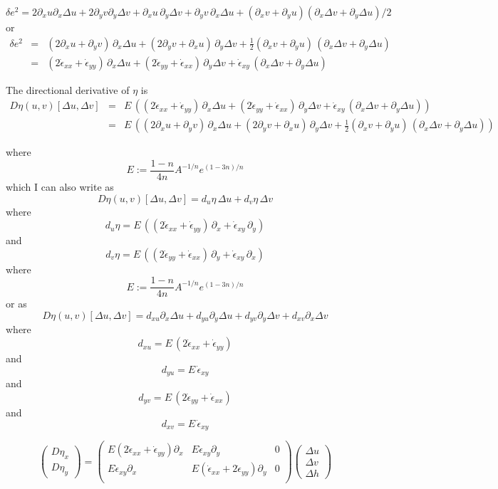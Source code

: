 \documentclass[10pt,a4paper]{book}
\newcommand{\p}{\partial}
\newcommand{\exx}{\dot{\epsilon}_{xx}}
\newcommand{\eyy}{\dot{\epsilon}_{yy}}
\newcommand{\exy}{\dot{\epsilon}_{xy}}
\begin{document}
\[ \delta e^2=  2 \p_x u  \p_x \Delta u 
+  2 \p_y v \p_y \Delta v  
+  \p_x u  \, \p_y \Delta v +  \p_y v \, \p_x \Delta u  
+ (\p_x v+\p_y u )(\p_x \Delta v + \p_y \Delta u)/2
\]
or
\begin{eqnarray*}
\delta e^2&=&  
  ( 2 \p_x u  +  \p_y v ) \, \p_x \Delta u 
+  (2 \p_y v +  \p_x u  ) \, \p_y \Delta v  
+ \frac{1}{2} (\p_x v+\p_y u ) \, (\p_x \Delta v + \p_y \Delta u) \\
&=& 
  ( 2 \exx +  \eyy ) \, \p_x \Delta u 
+  (2 \eyy +  \exx ) \, \p_y \Delta v  
+ \exy \, (\p_x \Delta v + \p_y \Delta u)
\end{eqnarray*}

The directional derivative of $\eta$ is
\begin{eqnarray*}
D \eta(u,v)[\Delta u, \Delta v]&=&E \,   (( 2 \exx +  \eyy ) \, \p_x \Delta u  +  (2 \eyy +  \exx ) \, \p_y \Delta v   + \exy \, (\p_x \Delta v + \p_y \Delta u))\\
&=&E \,   (( 2 \p_x u +  \p_y v ) \, \p_x \Delta u  +  (2 \p_y v +  \p_x u ) \, \p_y \Delta v   + \frac{1}{2}(\p_x v+ \p_y u) \, (\p_x \Delta v + \p_y \Delta u))
\end{eqnarray*}


where
\[ 
E:=\frac{1-n}{4n} A^{-1/n}  e^{(1-3n)/n}
\]
which I can also write as
\begin{equation}
D \eta(u,v)[\Delta u, \Delta v]= d_u \eta \, \Delta u + d_v \eta \, \Delta v 
\label{eq:deuv}
\end{equation}
where
\[
d_u \eta =E\,(( 2 \exx +  \eyy ) \, \p_x   + \exy \,  \p_y )
\]
and
\[
d_v \eta= E\,((2 \eyy +  \exx ) \, \p_y    + \exy \, \p_x ) 
\]
where
\[ 
E:=\frac{1-n}{4n} A^{-1/n}  e^{(1-3n)/n}
\]
or as
\begin{equation}
D \eta(u,v)[\Delta u, \Delta v]= d_{xu} \p_x \Delta u + d_{yu} \p_y \Delta u + d_{yv} \p_y \Delta v + d_{xv} \p_x \Delta v %
\label{eq:dddd}
\end{equation}
where
\[
d_{xu} =E\,( 2 \exx +  \eyy ) 
\]
and
\[
d_{yu}  =E\, \exy 
\]
and
\[
d_{yv} = E\, (2 \eyy +  \exx ) 
\]
and
\[
d_{xv} = E\, \exy 
\]

\begin{equation}
\begin{pmatrix} D \eta_x \\ D \eta_y \end{pmatrix}
=  \begin{pmatrix} E (2 \exx+\eyy) \p_x &   E \exy  \p_y &    0 \\
                   E \exy  \p_x &  E (\exx  + 2 \eyy) \p_y & 0  \\
   \end{pmatrix}
\begin{pmatrix} \Delta u  \\ \Delta v \\ \Delta h \end{pmatrix}
\end{equation}
\end{document}
